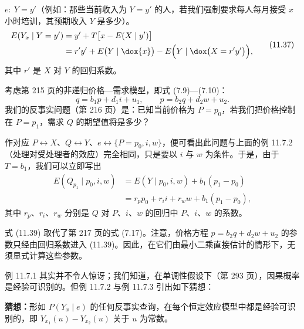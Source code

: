 \begin{example}
$e:\ Y=y'$（例如：那些当前收入为 $Y=y'$ 的人，若我们强制要求每人每月接受 $x$ 小时培训，其预期收入 $Y$ 是多少）。
\begin{equation}
\begin{aligned}
E(Y_x\mid Y=y')&=y'+T\bigl[x-E(X\mid y')\bigr]\\
&=r'y'+E\bigl(Y\mid\dox{x}\bigr)-E\Bigl(Y\mid\dox\bigl(X=r'y'\bigr)\Bigr),
\end{aligned} \tag{11.37}
\end{equation}
其中 $r'$ 是 $X$ 对 $Y$ 的回归系数。
\end{example}

\begin{example}
考虑第 215 页的非递归价格—需求模型，即式 \textup{(7.9)}—\textup{(7.10)}：
\begin{equation}
q=b_1p+d_1i+u_1,\qquad p=b_2q+d_2w+u_2. \tag{11.38}
\end{equation}
我们的反事实问题（第 216 页）是：已知当前价格为 $P=p_0$，若我们把价格控制在 $P=p_1$，需求 $Q$ 的期望值将是多少？

作对应 $P\leftrightarrow X$、$Q\leftrightarrow Y$、$e\leftrightarrow\{P=p_0,i,w\}$，便可看出此问题与上面的例 11.7.2（处理对受处理者的效应）完全相同，只是要以 $i$ 与 $w$ 为条件。于是，由于 $T=b_1$，我们可以立即写出
\begin{equation}
\begin{aligned}
E(Q_{p_1}\mid p_0,i,w)&=E(Y\mid p_0,i,w)+b_1(p_1-p_0)\\
&=r_pp_0+r_ii+r_ww+b_1(p_1-p_0),
\end{aligned} \tag{11.39}
\end{equation}
其中 $r_p$、$r_i$、$r_w$ 分别是 $Q$ 对 $P$、$i$、$w$ 的回归中 $P$、$i$、$w$ 的系数。
\end{example}

式 \textup{(11.39)} 取代了第 217 页的式 \textup{(7.17)}。注意，价格方程 $p=b_2q+d_2w+u_2$ 的参数只经由回归系数进入 \textup{(11.39)}。因此，在它们由最小二乘直接估计的情形下，无须显式计算这些参数。

\begin{remarkenv}
例 11.7.1 其实并不令人惊讶；我们知道，在单调性假设下（第 293 页），因果概率是经验可识别的。但例 11.7.2 与例 11.7.3 引出如下猜想：
\end{remarkenv}

\noindent\textbf{猜想：}形如 $P(Y_x\mid e)$ 的任何反事实查询，在每个恒定效应模型中都是经验可识别的，即 $Y_{x_1}(u)-Y_{x_2}(u)$ 关于 $u$ 为常数。

